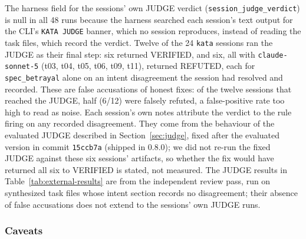 \documentclass{sbc2019}%
\begin{document}
The harness field for the sessions' own JUDGE verdict
(\texttt{session\_judge\_verdict}) is null in all 48 runs because the harness
searched each session's text output for the CLI's \texttt{KATA JUDGE}
banner, which no session reproduces, instead of
reading the task files, which record the verdict. Twelve of the 24
\texttt{kata} sessions ran the JUDGE as their final step: six returned
VERIFIED, and six, all with \texttt{claude-sonnet-5} (t03, t04, t05, t06, t09,
t11), returned REFUTED, each for \texttt{spec\_betrayal} alone on an intent
disagreement the session had resolved and recorded. These are false
accusations of honest fixes: of the twelve sessions that reached the JUDGE,
half (6/12) were falsely refuted, a false-positive rate too high to read as
noise. Each session's own notes attribute the
verdict to the rule firing on any recorded disagreement. They come from the
behaviour of the evaluated JUDGE described in Section~\ref{sec:judge}, fixed
after the evaluated version in commit \texttt{15ccb7a} (shipped in 0.8.0); we did not re-run
the fixed JUDGE against these six sessions' artifacts, so whether the fix
would have returned all six to VERIFIED is stated, not measured. The JUDGE results in
Table~\ref{tab:external-results} are from the independent review pass, run on
synthesized task files whose intent section records no disagreement; their
absence of false accusations does not extend to the sessions' own JUDGE
runs.

\subsubsection{Caveats}
\end{document}

